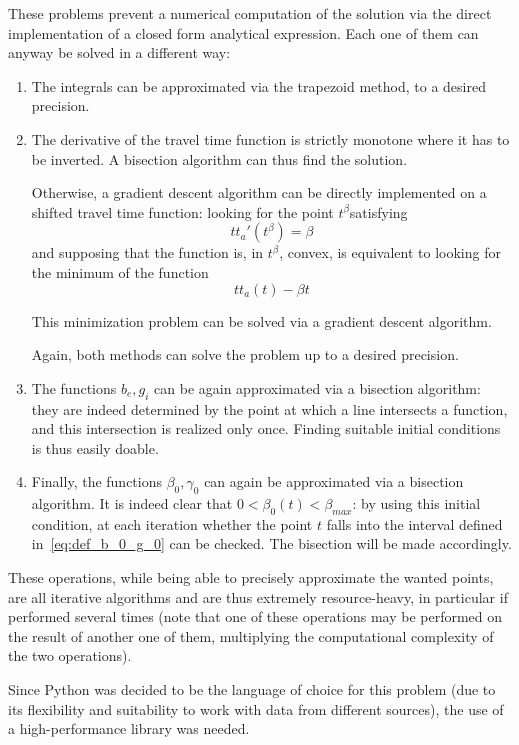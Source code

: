 These problems prevent a numerical computation of the solution via the direct implementation of a closed form analytical expression.
Each one of them can anyway be solved in a different way:
\begin{enumerate}
\item The integrals can be approximated via the trapezoid method,
  to a desired precision.
\item The derivative of the travel time function is strictly monotone where it has to be inverted.
  A bisection algorithm can thus find the solution.

  Otherwise, a gradient descent algorithm can be directly implemented on a shifted travel time function:
  looking for the point \(t^\beta\)satisfying
  \begin{equation*}
    tt_a'(t^\beta) = \beta
  \end{equation*}
  and supposing that the function is, in \(t^\beta\), convex,
  is equivalent to looking for the minimum of the function
  \begin{equation*}
    tt_a(t) - \beta t
  \end{equation*}

  This minimization problem can be solved via a gradient descent algorithm.

  Again, both methods can solve the problem up to a desired precision.
\item The functions \(b_e, g_i\) can be again approximated via a bisection algorithm:
  they are indeed determined by the point at which a line intersects a function,
  and this intersection is realized only once.
  Finding suitable initial conditions is thus easily doable.
\item Finally, the functions \(\beta_0, \gamma_0\) can again be approximated via a bisection algorithm.
  It is indeed clear that \(0 < \beta_0(t) < \beta_{max}\):
  by using this initial condition,
  at each iteration whether the point \(t\) falls into the interval defined in~\eqref{eq:def_b_0_g_0} can be checked.
  The bisection will be made accordingly.
\end{enumerate}

These operations, while being able to precisely approximate the wanted points,
are all iterative algorithms and are thus extremely resource-heavy,
in particular if performed several times
(note that one of these operations may be performed on the result of another one of them,
multiplying the computational complexity of the two operations).

Since Python was decided to be the language of choice for this problem
(due to its flexibility and suitability to work with data from different sources),
the use of a high-performance library was needed.

